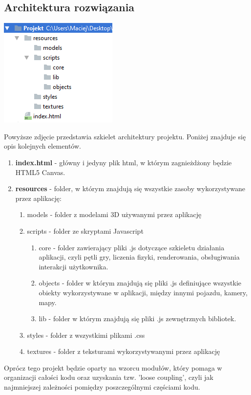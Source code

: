 \documentclass[11pt]{article}
\let\Oldsubsection\subsection
\renewcommand{\subsection}{\FloatBarrier\Oldsubsection}
\begin{document}
\newpage
\subsection{Architektura rozwiązania}
\begin{center}
\includegraphics[scale=1]{architecture}
\end{center}

Powyższe zdjęcie przedstawia szkielet architektury projektu. Poniżej znajduje się opis kolejnych elementów.

\begin{enumerate}
\item \textbf{index.html} - główny i jedyny plik html, w którym zagnieżdżony będzie HTML5 Canvas.
\item \textbf{resources} - folder, w którym znajdują się wszystkie zasoby wykorzystywane przez aplikację:
\begin{enumerate}
\item models - folder z modelami 3D używanymi przez aplikację
\item scripts - folder ze skryptami Javascript
\begin{enumerate}
\item core - folder zawierający pliki .js dotyczące szkieletu działania aplikacji, czyli pętli gry, liczenia fizyki, renderowania, obsługiwania interakcji użytkownika.
\item objects - folder w którym znajdują się pliki .js definiujące wszystkie obiekty wykorzystywane w aplikacji, między innymi pojazdu, kamery, mapy.
\item lib - folder w którym znajdują się pliki .js zewnętrznych bibliotek.
\end{enumerate}
\item styles - folder z wszystkimi plikami .css
\item textures - folder z teksturami wykorzystywanymi przez aplikację
\end{enumerate}
\end{enumerate}

Oprócz tego projekt będzie oparty na wzorcu modułów, który pomaga w organizacji całości kodu oraz uzyskania tzw. 'loose coupling', czyli jak najmniejszej zależności pomiędzy poszczególnymi częściami kodu.
\end{document}
